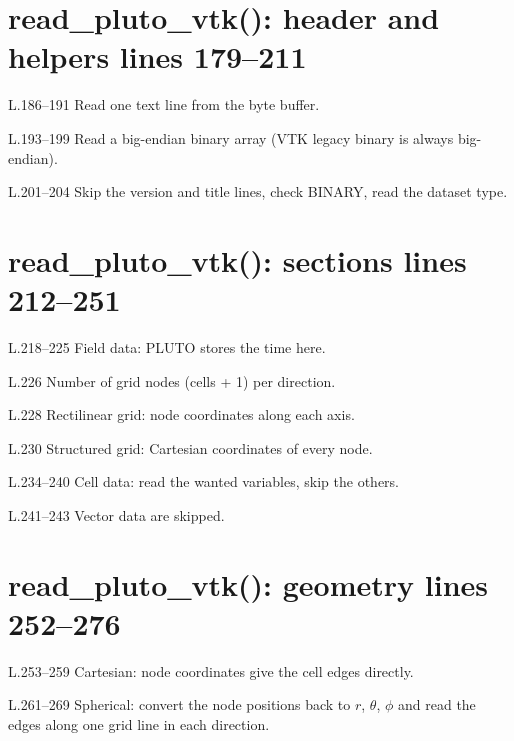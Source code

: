 \section*{\normalsize read\_pluto\_vtk(): header and helpers \hfill{\small\mdseries\color{gray}lines 179--211}}

\begin{lines}
\item[L.186–191] Read one text line from the byte buffer.
\item[L.193–199] Read a big-endian binary array (VTK legacy binary is always big-endian).
\item[L.201–204] Skip the version and title lines, check BINARY, read the dataset type.
\end{lines}
\section*{\normalsize read\_pluto\_vtk(): sections \hfill{\small\mdseries\color{gray}lines 212--251}}

\begin{lines}
\item[L.218–225] Field data: PLUTO stores the time here.
\item[L.226] Number of grid nodes (cells + 1) per direction.
\item[L.228] Rectilinear grid: node coordinates along each axis.
\item[L.230] Structured grid: Cartesian coordinates of every node.
\item[L.234–240] Cell data: read the wanted variables, skip the others.
\item[L.241–243] Vector data are skipped.
\end{lines}
\section*{\normalsize read\_pluto\_vtk(): geometry \hfill{\small\mdseries\color{gray}lines 252--276}}

\begin{lines}
\item[L.253–259] Cartesian: node coordinates give the cell edges directly.
\item[L.261–269] Spherical: convert the node positions back to $r$, $\theta$, $\phi$ and read the edges along one grid line in each direction.
\end{lines}
